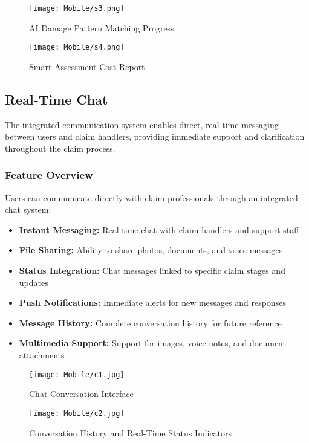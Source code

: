 \documentclass[12pt,a4paper]{report}
\begin{document}
\begin{figure}[H]
    \centering
    \begin{minipage}{0.45\textwidth}
        \centering
        \texttt{[image: Mobile/s3.png]}
        \caption{AI Damage Pattern Matching Progress}
        \label{fig:smart_assessment3}
    \end{minipage}
    \hfill
    \begin{minipage}{0.45\textwidth}
        \centering
        \texttt{[image: Mobile/s4.png]}
        \caption{Smart Assessment Cost Report}
        \label{fig:smart_assessment4}
    \end{minipage}
\end{figure}

\subsection{Real-Time Chat}

The integrated communication system enables direct, real-time messaging between users and claim handlers, providing immediate support and clarification throughout the claim process.

\subsubsection{Feature Overview}

Users can communicate directly with claim professionals through an integrated chat system:

\begin{itemize}
    \item \textbf{Instant Messaging:} Real-time chat with claim handlers and support staff
    \item \textbf{File Sharing:} Ability to share photos, documents, and voice messages
    \item \textbf{Status Integration:} Chat messages linked to specific claim stages and updates
    \item \textbf{Push Notifications:} Immediate alerts for new messages and responses
    \item \textbf{Message History:} Complete conversation history for future reference
    \item \textbf{Multimedia Support:} Support for images, voice notes, and document attachments
\end{itemize}

\begin{figure}[H]
    \centering
    \begin{minipage}{0.45\textwidth}
        \centering
        \texttt{[image: Mobile/c1.jpg]}
        \caption{Chat Conversation Interface}
        \label{fig:chat_conversation1}
    \end{minipage}
    \hfill
    \begin{minipage}{0.45\textwidth}
        \centering
        \texttt{[image: Mobile/c2.jpg]}
        \caption{Conversation History and Real-Time Status Indicators}
        \label{fig:chat_conversation2}
    \end{minipage}
\end{figure}
\end{document}
